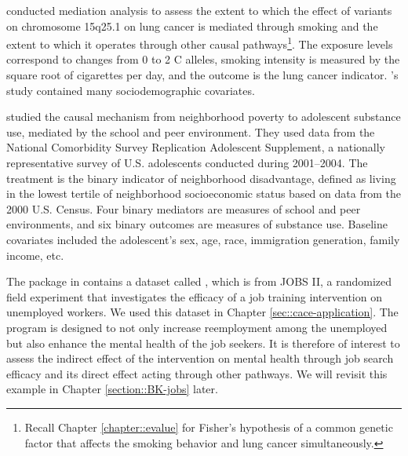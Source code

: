 \begin{example}
\citet{Vanderweele::2012genetic} conducted mediation analysis to assess the extent to which the effect of variants on chromosome 15q25.1 on lung cancer is mediated through smoking and the extent to which it operates through other causal pathways\footnote{Recall Chapter \ref{chapter::evalue} for Fisher's hypothesis of a common genetic factor that affects the smoking behavior and lung cancer simultaneously.}. The exposure levels correspond to changes from 0 to 2 C alleles, smoking intensity is measured by the square root of cigarettes per day, and the outcome is the lung cancer indicator. \citet{Vanderweele::2012genetic}'s study contained many sociodemographic covariates.  %
\end{example}



\begin{example}
\citet{rudolph2018causal} studied the causal mechanism from neighborhood poverty to adolescent substance use, mediated by the school and peer environment. They used data from the National Comorbidity Survey Replication Adolescent Supplement, a nationally representative survey of U.S. adolescents conducted during 2001--2004. The treatment is the binary indicator of neighborhood disadvantage, defined as living in the lowest tertile of neighborhood socioeconomic status based on data from the 2000 U.S. Census. 
Four binary mediators are measures of school and peer environments, and six binary outcomes are measures of substance use. 
Baseline covariates included the adolescent's sex, age, race, immigration generation, family income, etc.
\end{example}


\begin{example}\label{eg::mediation-jobs}
The  package in  contains a dataset called , which is from JOBS II, a randomized field experiment that investigates the efficacy of a job training intervention on unemployed workers. 
We used this dataset in Chapter \ref{sec::cace-application}. 
The program is designed to not only increase reemployment among the unemployed but also enhance the mental health of the job seekers. It is therefore of interest to assess the indirect effect of the intervention on mental health through job search efficacy and its direct effect acting through other pathways. We will revisit this example in Chapter \ref{section::BK-jobs} later. 
\end{example}



